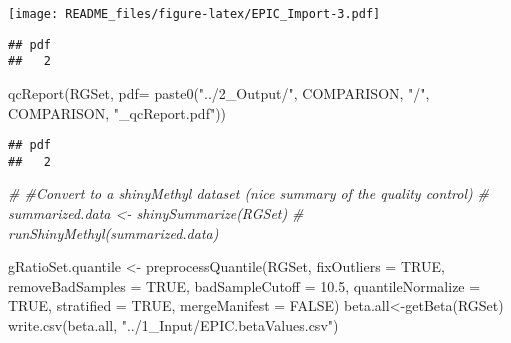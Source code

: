 \documentclass[
  10pt,
]{article}
\newenvironment{Shaded}{\begin{snugshade}}{\end{snugshade}}
\newcommand{\AttributeTok}[1]{\textcolor[rgb]{0.77,0.63,0.00}{#1}}
\newcommand{\CommentTok}[1]{\textcolor[rgb]{0.56,0.35,0.01}{\textit{#1}}}
\newcommand{\ConstantTok}[1]{\textcolor[rgb]{0.00,0.00,0.00}{#1}}
\newcommand{\FloatTok}[1]{\textcolor[rgb]{0.00,0.00,0.81}{#1}}
\newcommand{\FunctionTok}[1]{\textcolor[rgb]{0.00,0.00,0.00}{#1}}
\newcommand{\NormalTok}[1]{#1}
\newcommand{\OtherTok}[1]{\textcolor[rgb]{0.56,0.35,0.01}{#1}}
\newcommand{\SpecialCharTok}[1]{\textcolor[rgb]{0.00,0.00,0.00}{#1}}
\newcommand{\StringTok}[1]{\textcolor[rgb]{0.31,0.60,0.02}{#1}}
\begin{document}
\begin{Shaded}
\end{Shaded}

\texttt{[image: README\_files/figure-latex/EPIC\_Import-3.pdf]}

\begin{Shaded}
\end{Shaded}

\begin{verbatim}
## pdf 
##   2
\end{verbatim}

\begin{Shaded}
\begin{Highlighting}[]
\FunctionTok{qcReport}\NormalTok{(RGSet, }\AttributeTok{pdf=} \FunctionTok{paste0}\NormalTok{(}\StringTok{"../2\_Output/"}\NormalTok{, COMPARISON, }\StringTok{"/"}\NormalTok{, COMPARISON, }\StringTok{"\_qcReport.pdf"}\NormalTok{))}
\end{Highlighting}
\end{Shaded}

\begin{verbatim}
## pdf 
##   2
\end{verbatim}

\begin{Shaded}
\begin{Highlighting}[]
\CommentTok{\# \#Convert to a shinyMethyl dataset (nice summary of the quality control)}
\CommentTok{\# summarized.data \textless{}{-} shinySummarize(RGSet)}
\CommentTok{\# runShinyMethyl(summarized.data)}

\NormalTok{gRatioSet.quantile }\OtherTok{\textless{}{-}} \FunctionTok{preprocessQuantile}\NormalTok{(RGSet, }\AttributeTok{fixOutliers =} \ConstantTok{TRUE}\NormalTok{, }\AttributeTok{removeBadSamples =} \ConstantTok{TRUE}\NormalTok{, }\AttributeTok{badSampleCutoff =} \FloatTok{10.5}\NormalTok{, }\AttributeTok{quantileNormalize =} \ConstantTok{TRUE}\NormalTok{, }\AttributeTok{stratified =} \ConstantTok{TRUE}\NormalTok{, }\AttributeTok{mergeManifest =} \ConstantTok{FALSE}\NormalTok{)}
\NormalTok{beta.all}\OtherTok{\textless{}{-}}\FunctionTok{getBeta}\NormalTok{(RGSet)}
\FunctionTok{write.csv}\NormalTok{(beta.all, }\StringTok{"../1\_Input/EPIC.betaValues.csv"}\NormalTok{)}
\end{Highlighting}
\end{Shaded}
\end{document}
